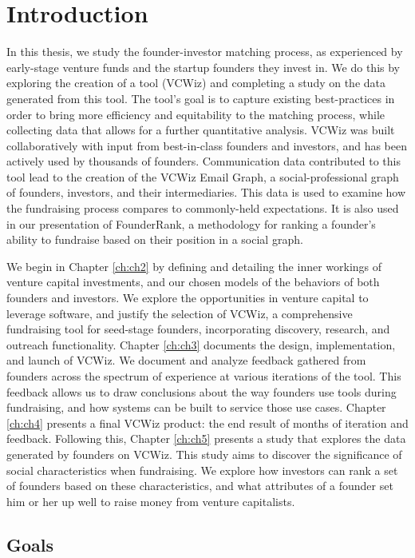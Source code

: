 \chapter{Introduction}

In this thesis, we study the founder-investor matching process, as experienced by early-stage venture funds and the startup founders they invest in. We do this by exploring the creation of a tool (VCWiz) and completing a study on the data generated from this tool. The tool's goal is to capture existing best-practices in order to bring more efficiency and equitability to the matching process, while collecting data that allows for a further quantitative analysis. VCWiz was built collaboratively with input from best-in-class founders and investors, and has been actively used by thousands of founders. Communication data contributed to this tool lead to the creation of the VCWiz Email Graph, a social-professional graph of founders, investors, and their intermediaries. This data is used to examine how the fundraising process compares to commonly-held expectations. It is also used in our presentation of FounderRank, a methodology for ranking a founder's ability to fundraise based on their position in a social graph.

We begin in Chapter \ref{ch:ch2} by defining and detailing the inner workings of venture capital investments, and our chosen models of the behaviors of both founders and investors. We explore the opportunities in venture capital to leverage software, and justify the selection of VCWiz, a comprehensive fundraising tool for seed-stage founders, incorporating discovery, research, and outreach functionality. Chapter \ref{ch:ch3} documents the design, implementation, and launch of VCWiz. We document and analyze feedback gathered from founders across the spectrum of experience at various iterations of the tool. This feedback allows us to draw conclusions about the way founders use tools during fundraising, and how systems can be built to service those use cases. Chapter \ref{ch:ch4} presents a final VCWiz product: the end result of months of iteration and feedback. Following this, Chapter \ref{ch:ch5} presents a study that explores the data generated by founders on VCWiz. This study aims to discover the significance of social characteristics when fundraising. We explore how investors can rank a set of founders based on these characteristics, and what attributes of a founder set him or her up well to raise money from venture capitalists.

\section{Goals}

